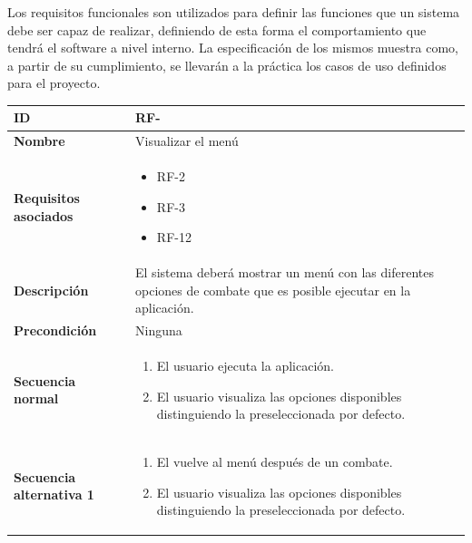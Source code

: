 Los requisitos funcionales son utilizados para definir las funciones que un sistema debe ser capaz de realizar, definiendo de esta forma el comportamiento que tendrá el software a nivel interno. La especificación de los mismos muestra como, a partir de su cumplimiento, se llevarán a la práctica los casos de uso definidos para el proyecto.


\setcounter{contador_requisitos_funcionales}{1}

\begin{center}
	\begin{tabular}{ | p{4.7cm} | p{10cm} | } 
		\hline
		
		\textbf{ID} & RF-\arabic{contador_requisitos_funcionales}
		{contador_requisitos_funcionales} \\
		
		\hline 
		\textbf{Nombre}&
		Visualizar el menú\\ 
		
		\hline
		\textbf{Requisitos asociados} & 
		\begin{itemize}
			\item RF-2
			\item RF-3
			\item RF-12
		\end{itemize}\\
		
		\hline
		\textbf{Descripción} & 
		El sistema deberá mostrar un menú con las diferentes opciones de combate que es posible ejecutar en la aplicación.\\
		
		\hline
		\textbf{Precondición} & 
		Ninguna
		\\
		
		\hline
		\textbf{Secuencia normal} &
		\begin{enumerate}
			\item El usuario ejecuta la aplicación.
			\item El usuario visualiza las opciones disponibles distinguiendo la preseleccionada por defecto.
		\end{enumerate}
		\\
		
		\hline
		\textbf{Secuencia alternativa 1} &
		\begin{enumerate}
			\item El vuelve al menú después de un combate.
			\item El usuario visualiza las opciones disponibles distinguiendo la preseleccionada por defecto.
		\end{enumerate}
		\\
		

\end{tabular}
\end{center}
